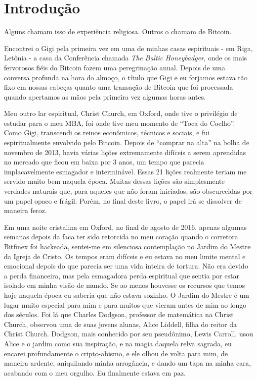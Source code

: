 \chapter*{Introdução}

Alguns chamam isso de experiência religiosa. Outros o chamam de Bitcoin.

Encontrei o Gigi pela primeira vez em uma de minhas casas espirituais - em Riga, Letônia - a casa da Conferência chamada \textit{The Baltic Honeybadger}, onde os mais fervorosos fiéis do Bitcoin fazem uma peregrinação anual. Depois de uma conversa profunda na hora do almoço, o título que Gigi e eu forjamos estava tão fixo em nossas cabeças quanto uma transação de Bitcoin que foi processada quando apertamos as mãos pela primeira vez algumas horas antes.

Meu outro lar espiritual, Christ Church, em Oxford, onde tive o privilégio de estudar para o meu MBA, foi onde tive meu momento de \enquote{Toca do Coelho}. Como Gigi, transcendi os reinos econômicos, técnicos e sociais, e fui espiritualmente envolvido pelo Bitcoin. Depois de \enquote{comprar na alta} na bolha de novembro de 2013, havia várias lições extremamente difíceis a serem aprendidas no mercado que ficou em baixa por 3 anos, um tempo que parecia implacavelmente esmagador e interminável. Essas 21 lições realmente teriam me servido muito bem naquela época. Muitas dessas lições são simplesmente verdades naturais que, para aqueles que não foram iniciados, são obscurecidas por um papel opaco e frágil. Porém, no final deste livro, o papel irá se dissolver de maneira feroz.

Em uma noite cristalina em Oxford, no final de agosto de 2016, apenas algumas semanas depois da faca ter sido retorcida no meu coração quando o corretora Bitfinex foi hackeada, sentei-me em silenciosa contemplação no Jardim do Mestre da Igreja de Cristo. Os tempos eram difíceis e eu estava no meu limite mental e emocional depois do que parecia ser uma vida inteira de tortura. Não era devido a perda financeira, mas pela esmagadora perda espiritual que sentia por estar isolado em minha visão de mundo. Se ao menos houvesse os recursos que temos hoje naquela época eu saberia que não estava sozinho. O Jardim do Mestre é um lugar muito especial para mim e para muitos que vieram antes de mim ao longo dos séculos. Foi lá que Charles Dodgson, professor de matemática na Christ Church, observou uma de suas jovens alunas, Alice Liddell, filha do reitor da Christ Church. Dodgson, mais conhecido por seu pseudônimo, Lewis Carroll, usou Alice e o jardim como sua inspiração, e na magia daquela relva sagrada, eu encarei profundamente o cripto-abismo, e ele olhou de volta para mim, de maneira ardente, aniquilando minha arrogância, e dando um tapa na minha cara, acabando com o meu orgulho. Eu finalmente estava em paz.

